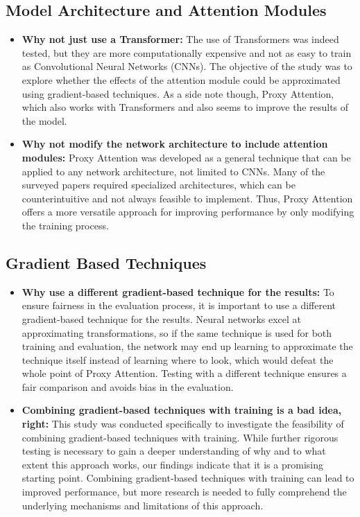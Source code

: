 \subsection{Model Architecture and Attention Modules}
\begin{itemize}
    \item \textbf{Why not just use a Transformer: }The use of Transformers was indeed tested, but they are more computationally expensive and not as easy to train as Convolutional Neural Networks (CNNs). The objective of the study was to explore whether the effects of the attention module could be approximated using gradient-based techniques. As a side note though, Proxy Attention, which also works with Transformers and also seems to improve the results of the model.
    \item \textbf{Why not modify the network architecture to include attention modules: }Proxy Attention was developed as a general technique that can be applied to any network architecture, not limited to CNNs. Many of the surveyed papers required specialized architectures, which can be counterintuitive and not always feasible to implement. Thus, Proxy Attention offers a more versatile approach for improving performance by only modifying the training process.
\end{itemize}

\subsection{Gradient Based Techniques}
\begin{itemize}
    \item \textbf{Why use a different gradient-based technique for the results: } To ensure fairness in the evaluation process, it is important to use a different gradient-based technique for the results. Neural networks excel at approximating transformations, so if the same technique is used for both training and evaluation, the network may end up learning to approximate the technique itself instead of learning where to look, which would defeat the whole point of Proxy Attention. Testing with a different technique ensures a fair comparison and avoids bias in the evaluation.

    \item \textbf{Combining gradient-based techniques with training is a bad idea, right: } This study was conducted specifically to investigate the feasibility of combining gradient-based techniques with training. While further rigorous testing is necessary to gain a deeper understanding of why and to what extent this approach works, our findings indicate that it is a promising starting point. Combining gradient-based techniques with training can lead to improved performance, but more research is needed to fully comprehend the underlying mechanisms and limitations of this approach.
\end{itemize}

